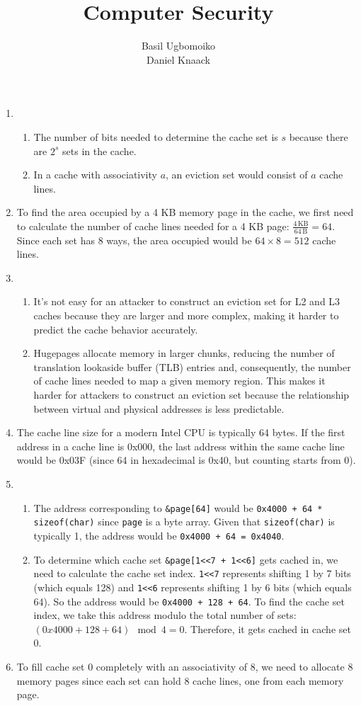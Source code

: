 \documentclass[sheet=2, prefix, english]{dexercise}
\title{Computer Security}
\author{Basil Ugbomoiko\\Daniel Knaack}
\begin{document}
\task[Caches]

\begin{enumerate}
  \item
    \begin{enumerate}
      \item The number of bits needed to determine the cache set is $s$ because there are $2^s$ sets in the cache.
      \item In a cache with associativity $a$, an eviction set would consist of $a$ cache lines.
    \end{enumerate}
  \item To find the area occupied by a 4 KB memory page in the cache, we first need to calculate the number of cache lines needed for a 4 KB page: $\frac{4\, \text{KB}}{64\, \text{B}} = 64$. Since each set has 8 ways, the area occupied would be $64 \times 8 = 512$ cache lines.
  \item 
    \begin{enumerate}
      \item It's not easy for an attacker to construct an eviction set for L2 and L3 caches because they are larger and more complex, making it harder to predict the cache behavior accurately.
      \item Hugepages allocate memory in larger chunks, reducing the number of translation lookaside buffer (TLB) entries and, consequently, the number of cache lines needed to map a given memory region. This makes it harder for attackers to construct an eviction set because the relationship between virtual and physical addresses is less predictable.
    \end{enumerate}
  \item The cache line size for a modern Intel CPU is typically 64 bytes. If the first address in a cache line is 0x000, the last address within the same cache line would be 0x03F (since 64 in hexadecimal is 0x40, but counting starts from 0).
  \item
    \begin{enumerate}
      \item The address corresponding to \texttt{\&page[64]} would be \texttt{0x4000 + 64 * sizeof(char)} since \texttt{page} is a byte array. Given that \texttt{sizeof(char)} is typically 1, the address would be \texttt{0x4000 + 64 = 0x4040}.
      \item To determine which cache set \texttt{\&page[1<<7 + 1<<6]} gets cached in, we need to calculate the cache set index. \texttt{1<<7} represents shifting 1 by 7 bits (which equals 128) and \texttt{1<<6} represents shifting 1 by 6 bits (which equals 64). So the address would be \texttt{0x4000 + 128 + 64}. To find the cache set index, we take this address modulo the total number of sets: $ (0x4000 + 128 + 64) \mod 4 = 0 $. Therefore, it gets cached in cache set 0.
    \end{enumerate}
  \item To fill cache set 0 completely with an associativity of 8, we need to allocate 8 memory pages since each set can hold 8 cache lines, one from each memory page.
\end{enumerate}
\end{document}
